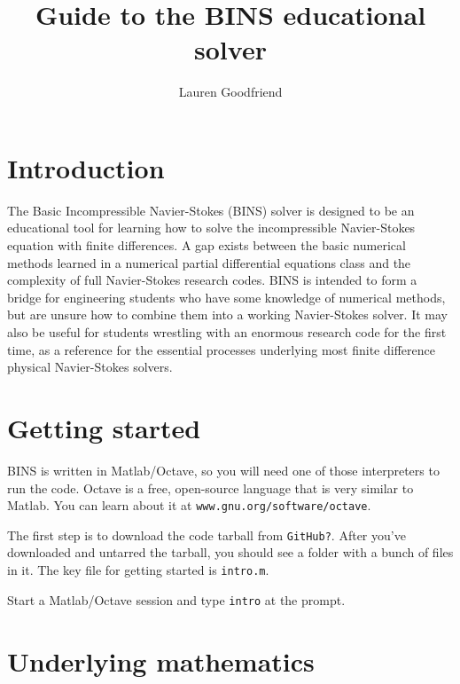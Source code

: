 \documentclass[12pt]{article}
\author{Lauren Goodfriend}
\title{Guide to the BINS educational solver}
\begin{document}
\maketitle
\tableofcontents

\section{Introduction}

The Basic Incompressible Navier-Stokes (BINS) solver is designed to be an educational tool for learning how to solve the incompressible Navier-Stokes equation with finite differences.  A gap exists between the basic numerical methods learned in a numerical partial differential equations class and the complexity of full Navier-Stokes research codes.  BINS is intended to form a bridge for engineering students who have some knowledge of numerical methods, but are unsure how to combine them into a working Navier-Stokes solver.  It may also be useful for students wrestling with an enormous research code for the first time, as a reference for the essential processes underlying most finite difference physical Navier-Stokes solvers.

\section{Getting started}

BINS is written in Matlab/Octave, so you will need one of those interpreters to run the code.  Octave is a free, open-source language that is very similar to Matlab.  You can learn about it at \texttt{www.gnu.org/software/octave}.

The first step is to download the code tarball from \texttt{GitHub?}.  After you've downloaded and untarred the tarball, you should see a folder with a bunch of files in it.  The key file for getting started is \texttt{intro.m}.

Start a Matlab/Octave session and type \texttt{intro} at the prompt.

\section{Underlying mathematics}
\end{document}
